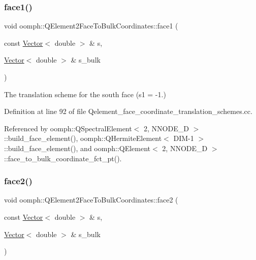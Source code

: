\subsubsection{\texorpdfstring{face1()}{face1()}}
{\footnotesize\ttfamily void oomph\+::\+Q\+Element2\+Face\+To\+Bulk\+Coordinates\+::face1 (\begin{DoxyParamCaption}\item[{const \hyperlink{classoomph_1_1Vector}{Vector}$<$ double $>$ \&}]{s,  }\item[{\hyperlink{classoomph_1_1Vector}{Vector}$<$ double $>$ \&}]{s\+\_\+bulk }\end{DoxyParamCaption})}



The translation scheme for the south face (s1 = -\/1.) 



Definition at line 92 of file Qelement\+\_\+face\+\_\+coordinate\+\_\+translation\+\_\+schemes.\+cc.



Referenced by oomph\+::\+Q\+Spectral\+Element$<$ 2, N\+N\+O\+D\+E\+\_\+D $>$\+::build\+\_\+face\+\_\+element(), oomph\+::\+Q\+Hermite\+Element$<$ D\+I\+M-\/1 $>$\+::build\+\_\+face\+\_\+element(), and oomph\+::\+Q\+Element$<$ 2, N\+N\+O\+D\+E\+\_\+D $>$\+::face\+\_\+to\+\_\+bulk\+\_\+coordinate\+\_\+fct\+\_\+pt().

\mbox{\label{namespaceoomph_1_1QElement2FaceToBulkCoordinates_a1c978f59cbaabaf63b65480667712840}} 
\subsubsection{\texorpdfstring{face2()}{face2()}}
{\footnotesize\ttfamily void oomph\+::\+Q\+Element2\+Face\+To\+Bulk\+Coordinates\+::face2 (\begin{DoxyParamCaption}\item[{const \hyperlink{classoomph_1_1Vector}{Vector}$<$ double $>$ \&}]{s,  }\item[{\hyperlink{classoomph_1_1Vector}{Vector}$<$ double $>$ \&}]{s\+\_\+bulk }\end{DoxyParamCaption})}



